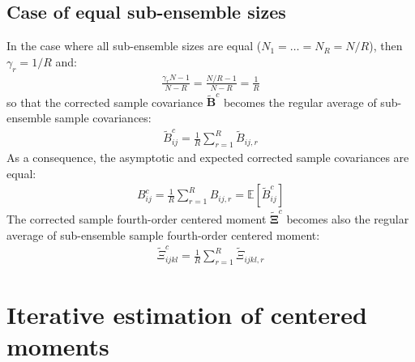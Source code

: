 \documentclass[12pt]{scrartcl}
\begin{document}
\subsection{Case of equal sub-ensemble sizes}
In the case where all sub-ensemble sizes are equal ($N_1 = \dots = N_R = N/R$), then $\gamma_r = 1/R$ and:
\begin{align}
\frac{\gamma_r N-1}{N-R} = \frac{N/R-1}{N-R} = \frac{1}{R}
\end{align}
so that the corrected sample covariance $\widetilde{\mathbf{B}}^c$ becomes the regular average of sub-ensemble sample covariances:
\begin{align}
\label{eq:Bc}
\widetilde{B}^c_{ij} = \frac{1}{R} \sum_{r=1}^R \widetilde{B}_{ij,r}
\end{align}
As a consequence, the asymptotic and expected corrected sample covariances are equal:
\begin{align}
B^c_{ij} = \frac{1}{R} \sum_{r=1}^R B_{ij,r} = \mathbb{E} \left[\widetilde{B}^c_{ij}\right]
\end{align}
The corrected sample fourth-order centered moment $\widetilde{\boldsymbol{\Xi}}^c$ becomes also the regular average of sub-ensemble sample fourth-order centered moment:
\begin{align}
\label{eq:Xic}
\widetilde{\Xi}^c_{ijkl} = \frac{1}{R} \sum_{r=1}^R \widetilde{\Xi}_{ijkl,r}
\end{align}

\clearpage

\section{Iterative estimation of centered moments}
\end{document}

